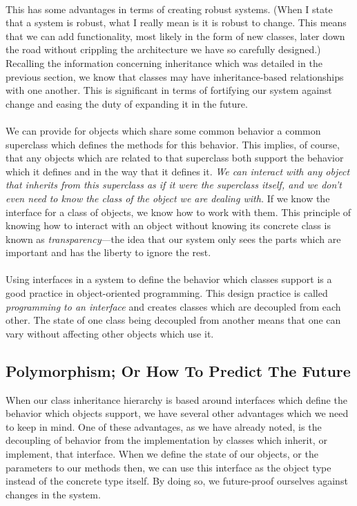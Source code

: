 \documentclass{article}
\begin{document}
\paragraph{}
This has some advantages in terms of creating robust systems. (When I state that
a system is robust, what I really mean is it is robust to change. This means
that we can add functionality, most likely in the form of new classes, later
down the road without crippling the architecture we have so carefully designed.)
Recalling the information concerning inheritance which was detailed in the
previous section, we know that classes may have inheritance-based relationships
with one another. This is significant in terms of fortifying our system against
change and easing the duty of expanding it in the future.
\paragraph{}
We can provide for objects which share some common behavior a common superclass 
which defines the methods for this behavior. This implies, of course, that any 
objects which are related to that superclass both support the behavior which it 
defines and in the way that it defines it. \textit{We can interact with any object 
that  inherits from this superclass as if it were the superclass itself, and we 
don’t even need to know the class of the object we are dealing with.} If we know 
the interface for a class of objects, we know how to work with them. This 
principle of knowing how to interact with an object without knowing its concrete 
class is known as \textit{transparency}---the idea that our system only sees the 
parts which are important and has the liberty to ignore the rest.
\paragraph{}
Using interfaces in a system to define the behavior which classes support is a
good practice in object-oriented programming. This design practice is called
\textit{programming to an interface} and creates classes which are
decoupled from each other. The state of one class being decoupled from another
means that one can vary without affecting other objects which use it. 
\subsection{Polymorphism; Or How To Predict The Future}
When our class inheritance hierarchy is based around interfaces which define the 
behavior which objects support, we have several other advantages which we need 
to keep in mind. One of these advantages, as we have already noted, is the
decoupling of behavior from the implementation by classes which inherit, or
implement, that interface. When we define the state of our objects, or the
parameters to our methods then, we can use this interface as the object type
instead of the concrete type itself. By doing so, we future-proof ourselves
against changes in the system. 
\end{document}
